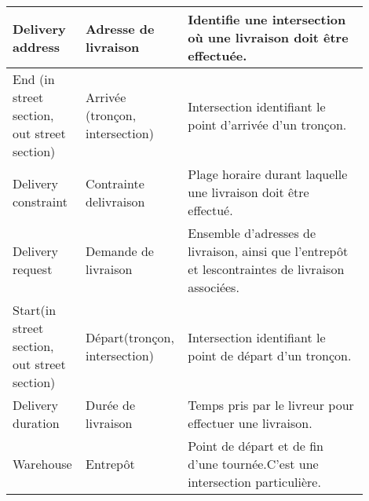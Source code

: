 \begin{longtable}{|p{0.2\linewidth}|p{0.2\linewidth}|p{0.5\linewidth}|}
\hline
Delivery address                            & Adresse de livraison            & Identifie une intersection où une livraison doit être effectuée.                                                                                                                                                                                                                    \\ \hline
End (in street section, out street section)   & Arrivée (tronçon, intersection) & Intersection identifiant le point d'arrivée d'un tronçon.                                                                                                                                                                                                                           \\ \hline
Delivery constraint                         & Contrainte delivraison         & Plage horaire durant laquelle une livraison doit être effectué.                                                                                                                                                                                                                     \\ \hline
Delivery request                            & Demande de livraison            & Ensemble d'adresses de livraison, ainsi que l'entrepôt et lescontraintes de livraison associées.                                                                                                                                                                                    \\ \hline
Start(in street section, out street section) & Départ(tronçon, intersection)  & Intersection identifiant le point de départ d'un tronçon.                                                                                                                                                                                                                           \\ \hline
Delivery duration                           & Durée de livraison             & Temps pris par le livreur pour effectuer une livraison.                                                                                                                                                                                                                             \\ \hline
Warehouse                                   & Entrepôt                       & Point de départ et de fin d'une tournée.C'est une intersection particulière.                                                                                                                                                                                                        \\ \hline

\end{longtable}
